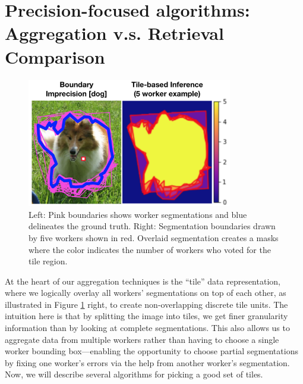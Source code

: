 \section{Precision-focused algorithms: Aggregation v.s. Retrieval Comparison}
\begin{figure}[h!]
\vspace{-10pt}
\centering
\includegraphics[width=0.8\textwidth]{plots/precision_issue_tile_example.png}
\caption{Left: Pink boundaries shows worker segmentations and blue delineates the ground truth. Right: Segmentation boundaries drawn by five workers shown in red. Overlaid segmentation creates a masks where the color indicates the number of workers who voted for the tile region.}
\label{tile_demo}
\end{figure}
\vspace{-10pt}
At the heart of our aggregation techniques is the ``tile'' data representation, where we logically overlay all workers' segmentations on top of each other, as illustrated in Figure \ref{tile_demo} right, to create non-overlapping discrete tile units. The intuition here is that by splitting the image into tiles, we get finer granularity information than by looking at complete segmentations. This also allows us to aggregate data from multiple workers rather than having to choose a single worker bounding box---enabling the opportunity to choose partial segmentations by fixing one worker's errors via the help from another worker's segmentation. Now, we will describe several algorithms for picking a good set of tiles.

